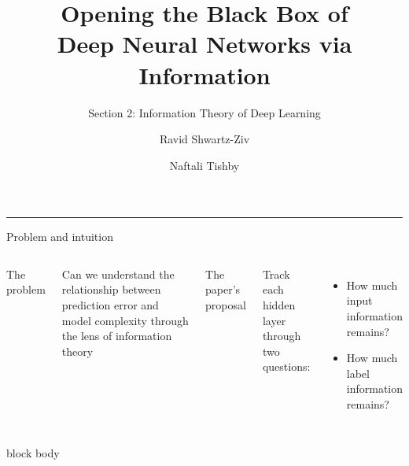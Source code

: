 
\title{Opening the Black Box of\\Deep Neural Networks via Information}
\subtitle{Section 2: Information Theory of Deep Learning}
\author{Ravid Shwartz-Ziv \and Naftali Tishby}
\date{}


{
\begin{frame}[plain]
  \vspace{0.8cm}
  \titlepage
  \vfill
  {\color{Accent}\rule{2.2cm}{2pt}}
\end{frame}
}

\begin{frame}{Problem and intuition}
  \begin{columns}[T,onlytextwidth]
      {\color{Accent}\large The problem}\par
      \vspace{0.18cm}
      Can we understand the relationship between prediction error and model complexity through the lens of information theory

      {\color{Teal}\large The paper's proposal}\par
      \vspace{0.18cm}
      Track each hidden layer through two questions:
      \begin{itemize}
        \item How much input information remains?
        \item How much label information remains?
      \end{itemize}
  \end{columns}
  \vfill
  \centering
  \begin{beamercolorbox}[wd=0.88\textwidth,sep=0.32cm,center]{block body}
  \end{beamercolorbox}
\end{frame}


